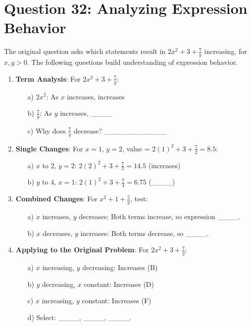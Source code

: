 \documentclass[12pt]{article}
\begin{document}
\section*{Question 32: Analyzing Expression Behavior}
The original question asks which statements result in \( 2x^2 + 3 + \frac{7}{y} \) increasing, for \( x, y > 0 \). The following questions build understanding of expression behavior.

\begin{enumerate}[label=32.\arabic*]
    \item \textbf{Term Analysis}: For \( 2x^2 + 3 + \frac{7}{y} \):
    \begin{enumerate}
        \item[a)] \( 2x^2 \): As \( x \) increases, increases
        \item[b)] \( \frac{7}{y} \): As \( y \) increases, \_\_\_\_
        \item[c)] Why does \( \frac{7}{y} \) decrease? \_\_\_\_\_\_\_\_\_\_\_\_
    \end{enumerate}
    \item \textbf{Single Changes}: For \( x = 1 \), \( y = 2 \), value = \( 2(1)^2 + 3 + \frac{7}{2} = 8.5 \):
    \begin{enumerate}
        \item[a)] \( x \) to 2, \( y = 2 \): \( 2(2)^2 + 3 + \frac{7}{2} = 14.5 \) (increases)
        \item[b)] \( y \) to 4, \( x = 1 \): \( 2(1)^2 + 3 + \frac{7}{4} = 6.75 \) (\_\_\_\_)
    \end{enumerate}
    \item \textbf{Combined Changes}: For \( x^2 + 1 + \frac{5}{y} \), test:
    \begin{enumerate}
        \item[a)] \( x \) increases, \( y \) decreases: Both terms increase, so expression \_\_\_\_.
        \item[b)] \( x \) decreases, \( y \) increases: Both terms decrease, so \_\_\_\_.
    \end{enumerate}
    \item \textbf{Applying to the Original Problem}: For \( 2x^2 + 3 + \frac{7}{y} \):
    \begin{enumerate}
        \item[a)] \( x \) increasing, \( y \) decreasing: Increases (B)
        \item[b)] \( y \) decreasing, \( x \) constant: Increases (D)
        \item[c)] \( x \) increasing, \( y \) constant: Increases (F)
        \item[d)] Select: \_\_\_\_, \_\_\_\_, \_\_\_\_.
    \end{enumerate}
\end{enumerate}

\end{document}
